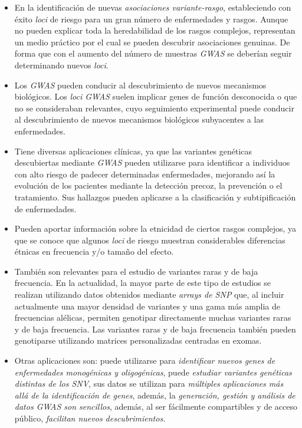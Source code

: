 \documentclass[IB,BIB]{TFUOC}%
\begin{document}
\footnotesize

\begin{itemize}
    \item En la identificación de nuevas \textit{asociaciones variante-rasgo}, estableciendo con éxito \textit{loci} de riesgo para un gran número de enfermedades y rasgos. Aunque no pueden explicar toda la heredabilidad de los rasgos complejos, representan un medio práctico por el cual se pueden descubrir asociaciones genuinas. De forma que con el aumento del número de muestras \textit{GWAS} se deberían seguir determinando nuevos \textit{loci}.
    \item Los \textit{GWAS} pueden conducir al descubrimiento de nuevos mecanismos biológicos. Los \textit{loci GWAS} suelen implicar genes de función desconocida o que no se consideraban relevantes, cuyo seguimiento experimental puede conducir al descubrimiento de nuevos mecanismos biológicos subyacentes a las enfermedades.
    \item Tiene diversas aplicaciones clínicas, ya que las variantes genéticas descubiertas mediante \textit{GWAS} pueden utilizarse para identificar a individuos con alto riesgo de padecer determinadas enfermedades, mejorando así la evolución de los pacientes mediante la detección precoz, la prevención o el tratamiento. Sus hallazgos pueden aplicarse a la clasificación y subtipificación de enfermedades.
    \item Pueden aportar información sobre la etnicidad de ciertos rasgos complejos, ya que se conoce que algunos \textit{loci} de riesgo muestran considerables diferencias étnicas en frecuencia y/o tamaño del efecto.
    \item También son relevantes para el estudio de variantes raras y de baja frecuencia. En la actualidad, la mayor parte de este tipo de estudios se realizan utilizando datos obtenidos mediante \textit{arrays de SNP} que, al incluir actualmente una mayor densidad de variantes y una gama más amplia de frecuencias alélicas, permiten genotipar directamente muchas variantes raras y de baja frecuencia. Las variantes raras y de baja frecuencia también pueden genotiparse utilizando matrices personalizadas centradas en exomas.
    \item Otras aplicaciones son: puede utilizarse para \textit{identificar nuevos genes de enfermedades monogénicas y oligogénicas}, puede \textit{estudiar variantes genéticas distintas de los SNV}, sus datos se utilizan para \textit{múltiples aplicaciones más allá de la identificación de genes}, además, la \textit{generación, gestión y análisis de datos GWAS son sencillos}, además, al ser fácilmente compartibles y de acceso público, \textit{facilitan nuevos descubrimientos}.
\end{itemize}
\end{document}
